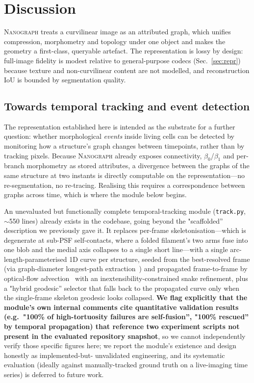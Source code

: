 \documentclass[10pt,a4paper]{article}
\newcommand{\method}{\textnormal{\textsc{Nanograph}}\xspace}
\begin{document}
\section{Discussion}\label{sec:discussion}
\method treats a curvilinear image as an attributed graph, which unifies
compression, morphometry and topology under one object and makes the geometry
a first-class, queryable artefact. The representation is lossy by design:
full-image fidelity is modest relative to general-purpose codecs
(Sec.~\ref{sec:repr}) because texture and non-curvilinear content are not
modelled, and reconstruction IoU is bounded by segmentation quality.

\subsection{Towards temporal tracking and event detection}
The representation established here is intended as the substrate for a further
question: whether morphological \emph{events} inside living cells can be
detected by monitoring how a structure's graph changes between timepoints,
rather than by tracking pixels. Because \method already exposes connectivity,
$\beta_0$/$\beta_1$ and per-branch morphometry as stored attributes, a
divergence between the graphs of the same structure at two instants is
directly computable on the representation---no re-segmentation, no
re-tracing. Realising this requires a correspondence between graphs across
time, which is where the module below begins.

An unevaluated but functionally complete temporal-tracking module
(\texttt{track.py}, $\sim$550 lines) already exists in the codebase, going
beyond the "scaffolded'' description we previously gave it. It replaces
per-frame skeletonisation---which is degenerate at sub-PSF self-contacts,
where a folded filament's two arms fuse into one blob and the medial axis
collapses to a single short line---with a single arc-length-parameterised 1D
curve per structure, seeded from the best-resolved frame (via graph-diameter
longest-path extraction~\cite{hagberg2008networkx}) and propagated frame-to-frame by optical-flow
advection~\cite{farneback2003} with an inextensibility-constrained snake
refinement, plus a "hybrid geodesic'' selector that falls back to the
propagated curve only when the single-frame skeleton geodesic looks
collapsed. \textbf{We flag explicitly that the module's own internal
comments cite quantitative validation results (e.g.\ "100\% of high-tortuosity
failures are self-fusion'', "100\% rescued'' by temporal propagation) that
reference two experiment scripts not present in the evaluated repository
snapshot}, so we cannot independently verify those specific figures here; we
report the module's existence and design honestly as implemented-but-
unvalidated engineering, and its systematic evaluation (ideally against
manually-tracked ground truth on a live-imaging time series) is deferred to
future work.
\end{document}
